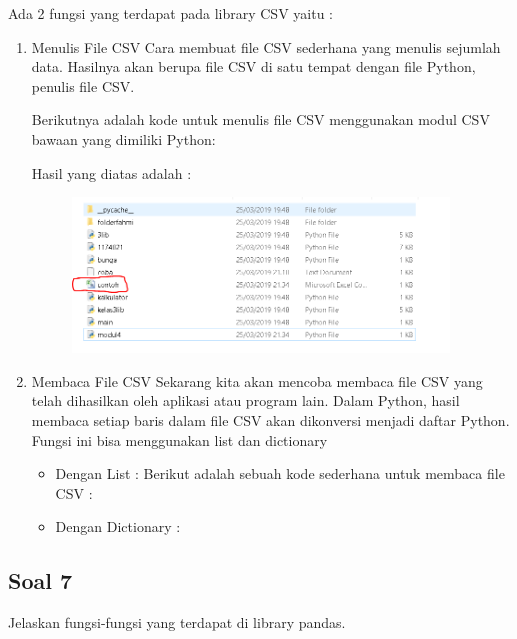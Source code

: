 Ada 2 fungsi yang terdapat pada library CSV yaitu :
\begin{enumerate} 
	\item Menulis File CSV 
	Cara membuat file CSV sederhana yang menulis sejumlah data. Hasilnya akan berupa file CSV di satu tempat dengan file Python, penulis file CSV.
	
	Berikutnya adalah kode untuk menulis file CSV menggunakan modul CSV bawaan yang dimiliki Python:
	
	
	
	Hasil yang diatas adalah : 
	\begin{figure}[H]
		\includegraphics[width=10cm]{figures/4/1174021/Teori/8.png}
		\centering
	\end{figure}
	
	\item Membaca File CSV 
	Sekarang kita akan mencoba membaca file CSV yang telah dihasilkan oleh aplikasi atau program lain. Dalam Python, hasil membaca setiap baris dalam file CSV akan dikonversi menjadi daftar Python. \\
	
	Fungsi ini bisa menggunakan list dan dictionary
	
	\begin{itemize}
		\item Dengan List :
		Berikut adalah sebuah kode sederhana untuk membaca file CSV :
		
		
		\item Dengan Dictionary : 
		
		
	\end{itemize}
	
\end{enumerate}

\subsection{Soal 7}
Jelaskan fungsi-fungsi yang terdapat di library pandas.

